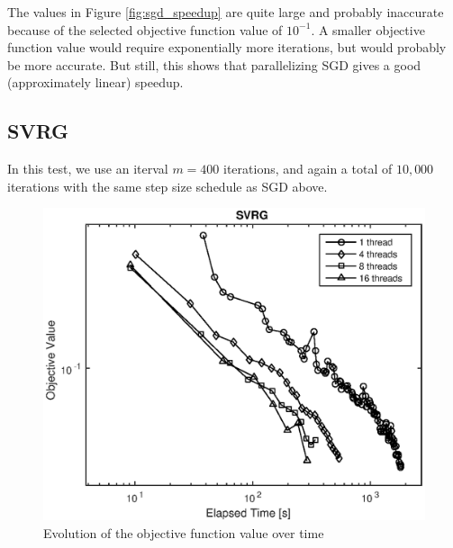 \documentclass{article}
\begin{document}
The values in Figure \ref{fig:sgd_speedup} are quite large and probably inaccurate because of the selected objective function value of $10^{-1}$. A smaller objective function value would require exponentially more iterations, but would probably be more accurate. But still, this shows that parallelizing SGD gives a good (approximately linear) speedup.

\subsection{SVRG}
In this test, we use an iterval $m=400$ iterations, and again a total of $10,000$ iterations with the same step size schedule as SGD above.

\begin{figure}[!htbp]
	\centering
	\includegraphics[scale=0.5]{figs/svrg_objective.eps}
	\caption{Evolution of the objective function value over time}
	\label{fig:svrg_objective}
\end{figure}
\end{document}
